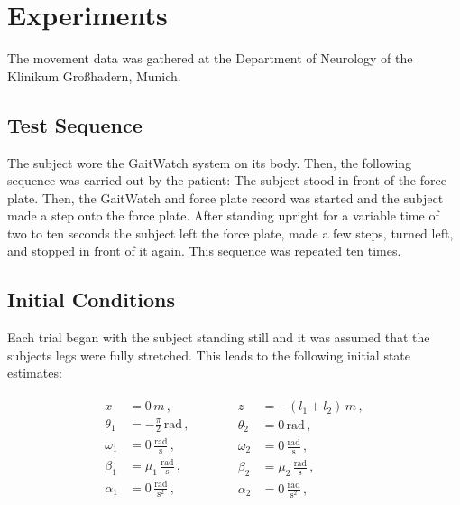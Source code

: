 \section{Experiments}

The movement data was gathered at the Department of Neurology of the Klinikum Großhadern, Munich.

\subsection{Test Sequence}

The subject wore the GaitWatch system on its body. Then, the following sequence was carried out by the patient: The subject stood in front of the force plate. Then, the GaitWatch and force plate record was started and the subject made a step onto the force plate. After standing upright for a variable time of two to ten seconds the subject left the force plate, made a few steps, turned left, and stopped in front of it again. This sequence was repeated ten times.

\subsection{Initial Conditions}

Each trial began with the subject standing still and it was assumed that the subjects legs were fully stretched. This leads to the following initial state estimates:

\begin{equation}
\begin{matrix}
	\begin{split}
	  x &= 0\,m\,, \\
	  \theta_1 &= -\frac{\pi}{2}\,\mbox{rad}\,, \\
	  \omega_1 &= 0\,\frac{\mbox{rad}}{\mbox{s}}\,, \\
	  \beta_1 &= \mu_1\,\frac{\mbox{rad}}{\mbox{s}}\,, \\
	  \alpha_1 &= 0\,\frac{\mbox{rad}}{\mbox{s}^2}\,,
\end{split} \qquad \quad
    \begin{split}
   	  z &= -(l_1+l_2)\,m\,, \\
	  \theta_2 &= 0\,\mbox{rad}\,, \mathrel{\phantom{\frac{\pi}{2}}}\\
	  \omega_2 &= 0\,\frac{\mbox{rad}}{\mbox{s}}\,, \\
	  \beta_2 &= \mu_2\,\frac{\mbox{rad}}{\mbox{s}}\,, \\
	  \alpha_2 &= 0\,\frac{\mbox{rad}}{\mbox{s}^2}\,,  
\end{split}
\end{matrix}
\end{equation}

